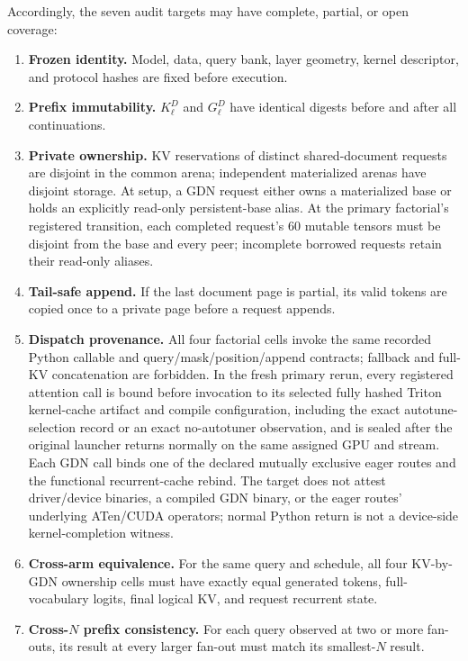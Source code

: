 \documentclass{article}
\begin{document}
Accordingly, the seven audit targets may have complete, partial, or open coverage:
\FloatBarrier
\begin{enumerate}
  \setlength{\itemsep}{1pt}
  \setlength{\parskip}{0pt}
  \item \textbf{Frozen identity.}  Model, data, query bank, layer geometry,
  kernel descriptor, and protocol hashes are fixed before execution.
  \item \textbf{Prefix immutability.}  $K^D_\ell$ and $G^D_\ell$ have identical
  digests before and after all continuations.
  \item \textbf{Private ownership.}  KV reservations of distinct
  shared-document requests are disjoint in the common arena; independent
  materialized arenas have disjoint storage.  At setup, a GDN request either
  owns a materialized base or holds an explicitly read-only persistent-base
  alias.  At the primary factorial's registered transition, each completed
  request's 60 mutable tensors must be disjoint from the base and every peer;
  incomplete borrowed requests retain their read-only aliases.
  \item \textbf{Tail-safe append.}  If the last document page is partial, its
  valid tokens are copied once to a private page before a request appends.
  \item \textbf{Dispatch provenance.}  All four factorial cells invoke the
  same recorded Python callable and query/mask/position/append contracts;
  fallback and full-KV concatenation are forbidden.  In the fresh primary
  rerun, every registered attention call is bound before invocation to its
  selected fully hashed Triton kernel-cache artifact and compile configuration, including
  the exact autotune-selection record or an exact no-autotuner observation,
  and is sealed after the original launcher returns normally on the same
  assigned GPU and stream.  Each
  GDN call binds one of the declared mutually exclusive eager routes and the
  functional recurrent-cache rebind.  The target does not attest
  driver/device binaries, a compiled GDN binary, or the eager routes'
  underlying ATen/CUDA operators; normal Python return is not a device-side
  kernel-completion witness.
  \item \textbf{Cross-arm equivalence.}  For the same query and schedule, all
  four KV-by-GDN ownership cells must have exactly equal generated
  tokens, full-vocabulary logits, final logical KV, and request recurrent
  state.
  \item \textbf{Cross-$N$ prefix consistency.}  For each query observed at two or more
  fan-outs, its result at every larger fan-out must match its smallest-$N$
  result.
\end{enumerate}
\end{document}
